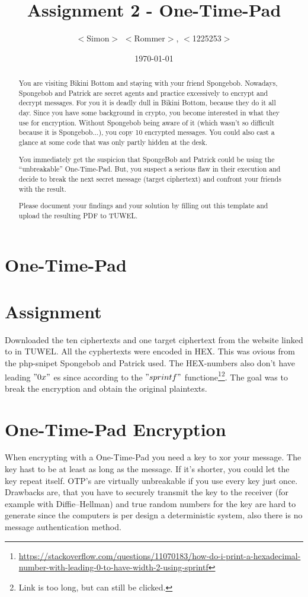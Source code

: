 \documentclass{scrartcl}
\title{Assignment 2 - One-Time-Pad}
\author{$<$Simon$>$ $<$Rommer$>$, $<$1225253$>$}
\date\today{}
\begin{document}
\maketitle

\begin{abstract}
You are visiting Bikini Bottom and staying with your friend Spongebob.
Nowadays, Spongebob and Patrick are secret agents and practice excessively
to encrypt and decrypt messages. For you it is deadly dull in Bikini
Bottom, because they do it all day. Since you have some background in
crypto, you become interested in what they use for encryption. Without
Spongebob being aware of it (which wasn't so difficult because it is
Spongebob...), you copy 10 encrypted messages. You could also cast a glance
at some code that was only partly hidden at the desk.

You immediately get the suspicion that SpongeBob and Patrick could be using the
``unbreakable'' One-Time-Pad. But, you suspect a serious flaw in their execution and
decide to break the next secret message (target ciphertext) and confront
your friends with the result.

Please document your findings and your solution by filling out this template
and upload the resulting PDF to TUWEL.
\end{abstract}



\section{One-Time-Pad}

\section*{Assignment}
Downloaded the ten ciphertexts and one target ciphertext from the website
linked to in TUWEL. All the cyphertexts were encoded in HEX. This was ovious from the php-snipet Spongebob and Patrick used. The HEX-numbers also don't have leading $"0x"$ es since according to the $"sprintf"$ functione\footnote{\url{https://stackoverflow.com/questions/11070183/how-do-i-print-a-hexadecimal-number-with-leading-0-to-have-width-2-using-sprintf}}\footnote{Link is too long, but can still be clicked.}. The goal was to break the encryption and obtain the
original plaintexts.





\section*{One-Time-Pad Encryption}
When encrypting with a One-Time-Pad you need a key to xor your message. The key hast to be at least as long as the message. If it's shorter, you could let the key repeat itself. OTP's are virtually unbreakable if you use every key just once. Drawbacks are, that you have to securely transmit the key to the receiver (for example with Diffie–Hellman) and true random numbers for the key are hard to generate since the computers is per design a deterministic system, also there is no message authentication method.
\end{document}
